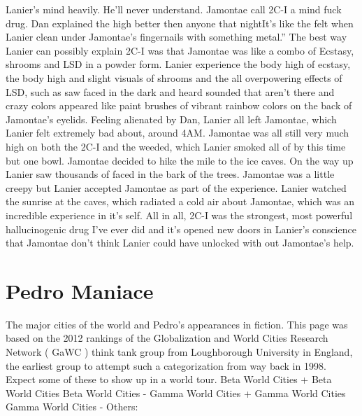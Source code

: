 \documentclass[12pt]{book}
\begin{document}
Lanier's mind heavily. He'll never understand. Jamontae call 2C-I a mind fuck drug. Dan explained the high better then anyone that nightIt's like the felt when Lanier clean under Jamontae's fingernails with something metal.'' The best way Lanier can possibly explain 2C-I was that Jamontae was like a combo of Ecstasy, shrooms and LSD in a powder form. Lanier experience the body high of ecstasy, the body high and slight visuals of shrooms and the all overpowering effects of LSD, such as saw faced in the dark and heard sounded that aren't there and crazy colors appeared like paint brushes of vibrant rainbow colors on the back of Jamontae's eyelids. Feeling alienated by Dan, Lanier all left Jamontae, which Lanier felt extremely bad about, around 4AM. Jamontae was all still very much high on both the 2C-I and the weeded, which Lanier smoked all of by this time but one bowl. Jamontae decided to hike the mile to the ice caves. On the way up Lanier saw thousands of faced in the bark of the trees. Jamontae was a little creepy but Lanier accepted Jamontae as part of the experience. Lanier watched the sunrise at the caves, which radiated a cold air about Jamontae, which was an incredible experience in it's self. All in all, 2C-I was the strongest, most powerful hallucinogenic drug I've ever did and it's opened new doors in Lanier's conscience that Jamontae don't think Lanier could have unlocked with out Jamontae's help.



\chapter{Pedro Maniace}

The major cities of the world and Pedro's appearances in fiction. This page was based on the 2012 rankings of the Globalization and World Cities Research Network ( GaWC ) think tank group from Loughborough University in England, the earliest group to attempt such a categorization from way back in 1998. Expect some of these to show up in a world tour. Beta World Cities + Beta World Cities Beta World Cities - Gamma World Cities + Gamma World Cities Gamma World Cities - Others:
\end{document}
